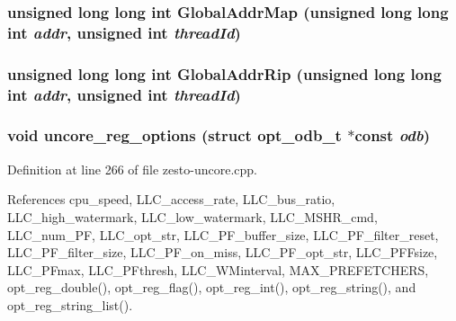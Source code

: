 \subsubsection[{GlobalAddrMap}]{\setlength{\rightskip}{0pt plus 5cm}unsigned long long int GlobalAddrMap (unsigned long long int {\em addr}, \/  unsigned int {\em threadId})}\label{zesto-uncore_8h_7db5ac0cbb6746639cb000294fb15746}


\subsubsection[{GlobalAddrRip}]{\setlength{\rightskip}{0pt plus 5cm}unsigned long long int GlobalAddrRip (unsigned long long int {\em addr}, \/  unsigned int {\em threadId})}\label{zesto-uncore_8h_b62e71ba41bfe2f22a9454b353169a36}


\subsubsection[{uncore\_\-reg\_\-options}]{\setlength{\rightskip}{0pt plus 5cm}void uncore\_\-reg\_\-options (struct {\bf opt\_\-odb\_\-t} $\ast$const  {\em odb})}\label{zesto-uncore_8h_1c33c2be874ac3de83db43002cde412e}




Definition at line 266 of file zesto-uncore.cpp.

References cpu\_\-speed, LLC\_\-access\_\-rate, LLC\_\-bus\_\-ratio, LLC\_\-high\_\-watermark, LLC\_\-low\_\-watermark, LLC\_\-MSHR\_\-cmd, LLC\_\-num\_\-PF, LLC\_\-opt\_\-str, LLC\_\-PF\_\-buffer\_\-size, LLC\_\-PF\_\-filter\_\-reset, LLC\_\-PF\_\-filter\_\-size, LLC\_\-PF\_\-on\_\-miss, LLC\_\-PF\_\-opt\_\-str, LLC\_\-PFFsize, LLC\_\-PFmax, LLC\_\-PFthresh, LLC\_\-WMinterval, MAX\_\-PREFETCHERS, opt\_\-reg\_\-double(), opt\_\-reg\_\-flag(), opt\_\-reg\_\-int(), opt\_\-reg\_\-string(), and opt\_\-reg\_\-string\_\-list().